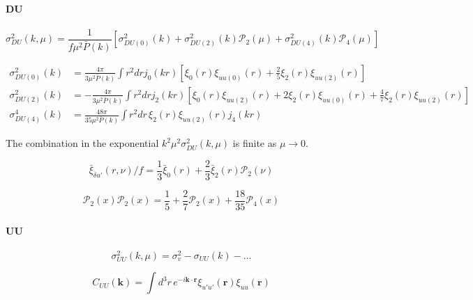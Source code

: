 \documentclass[a4paper,11pt, fleqn]{article}
\begin{document}
%
%
\paragraph{DU}
%
\begin{equation}
  \sigma^2_{DU}(k, \mu) = \frac{1}{f\mu^2 \bar{P}(k)}
  \left[
    \sigma^2_{DU(0)}(k) + \sigma^2_{DU(2)}(k) \mathcal{P}_2(\mu)
    + \sigma^2_{DU(4)}(k) \mathcal{P}_4(\mu)
    \right]
\end{equation}


\begin{align}
  \sigma^2_{DU(0)}(k) &= \frac{4\pi}{3 \mu^2\bar{P}(k)}
    \int\! r^2 dr  j_0(kr) \left[
      \xi_0(r) \xi_{uu(0)}(r) + \frac{2}{5} \xi_2(r) \xi_{uu(2)}(r)
    \right]\\
  \sigma^2_{DU(2)}(k) &= -\frac{4\pi}{3 \mu^2 \bar{P}(k)}
  \int\! r^2 dr j_2(kr) \left[
    \xi_0(r) \xi_{uu(2)}(r) + 2 \xi_2(r) \xi_{uu(0)}(r) + \frac{4}{7} \xi_2(r) \xi_{uu(2)}(r)
    \right] \\
  \sigma^4_{DU(4)}(k) &= \frac{48\pi}{35 \mu^2 \bar{P}(k)} \int\! r^2 dr \,
  \xi_2(r) \xi_{uu(2)}(r) j_4(kr)    
\end{align}

The combination in the exponential $k^2\mu^2 \sigma_{DU}^2(k, \mu)$ is
finite as $\mu \rightarrow 0$.

\begin{equation}
  \bar{\xi}_{\delta u'}(r, \nu)/f
  = \frac{1}{3} \bar{\xi}_0(r) + \frac{2}{3} \bar{\xi}_2(r) \mathcal{P}_2(\nu)
\end{equation}

\begin{equation}
  \mathcal{P}_2(x) \mathcal{P}_2(x)
  = \frac{1}{5} + \frac{2}{7} \mathcal{P}_2(x)
    + \frac{18}{35} \mathcal{P}_4(x)
\end{equation}

%
%
\clearpage
\paragraph{UU}

\begin{equation}
  \sigma_{UU}^2(k, \mu) = \sigma_v^2 - \sigma_{UU}(k) - ...
\end{equation}

\begin{equation}
  C_{UU}(\bm{k}) = \int \!\! d^3 r \, e^{-i\bm{k}\cdot\bm{r}} \xi_{u'u'}(\bm{r})
  \xi_{uu}(\bm{r})
\end{equation}
\end{document}
